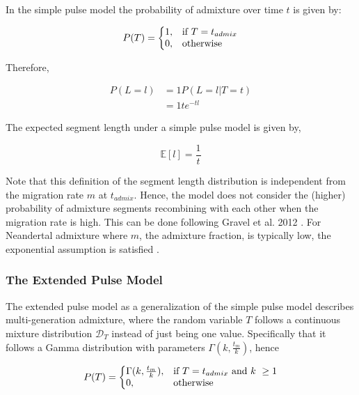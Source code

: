 \documentclass[]{article}
\begin{document}
In the simple pulse model the probability of admixture over time $t$ is given by:

\begin{equation}
\label{eq:RV_simple_pulse}
  P(T)=\left\{
  \begin{array}{@{}ll@{}}
    1, & \text{if}\ T=t_{admix} \\
    0, & \text{otherwise}
  \end{array}\right.
\end{equation} 

Therefore,

\begin{equation}
\begin{split}
\label{eq:Likelihood_function_simple_pulse}
    P(L=l) &=  1  P(L=l | T=t) \\
    &= 1 te^{-tl}
\end{split}
\end{equation}

The expected segment length under a simple pulse model is given by,

\begin{equation}
\label{eq:Expected_l_simple_pulse}
    \mathbb{E}[l]=\frac{1}{t}
\end{equation}

Note that this definition of the segment length distribution is independent from the migration rate $m$ at $t_{admix}$. Hence, the model does not consider the (higher) probability of admixture segments recombining with each other when the migration rate is high. This can be done following Gravel et al. 2012 \citep{gravel_population_2012}. For Neandertal admixture where $m$, the admixture fraction, is typically low, the exponential assumption is satisfied \citep{liang_lengths_2014}.

\subsubsection{The Extended Pulse Model}\label{The Extended Pulse Model}

The extended pulse model as a generalization of the simple pulse model describes multi-generation admixture, where the random variable $T$ follows a continuous mixture distribution $\mathcal{D}_{T}$ instead of just being one value. Specifically that it follows a Gamma distribution with parameters $\Gamma(k,\frac{t_m}{k})$, hence

\begin{equation}
\label{eq:RV_extended_pulse}
  P(T)=\left\{
  \begin{array}{@{}ll@{}}
    \Gamma(k,\frac{t_m}{k}), & \text{if}\ T=t_{admix}\ \text{and}\ k\ \geq 1\\
    0, & \text{otherwise}
  \end{array}\right.
\end{equation} 
\end{document}
